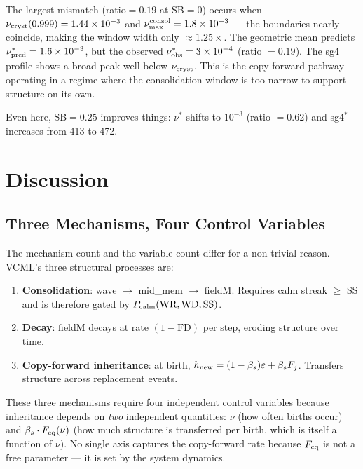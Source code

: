 \documentclass[11pt]{article}
\begin{document}
The largest mismatch (ratio$=0.19$ at SB$=0$) occurs when
$\nu_{\rm cryst}(0.999) = 1.44\times10^{-3}$ and
$\nu_{\rm max}^{\rm consol} = 1.8\times10^{-3}$ --- the boundaries nearly
coincide, making the window width only $\approx 1.25\times$. The geometric
mean predicts $\nu^*_{\rm pred} = 1.6\times10^{-3}$, but the observed
$\nu^*_{\rm obs} = 3\times10^{-4}$ (ratio $= 0.19$). The sg4 profile shows a
broad peak well below $\nu_{\rm cryst}$. This is the copy-forward pathway
operating in a regime where the consolidation window is too narrow to support
structure on its own.

Even here, SB$=0.25$ improves things: $\nu^*$ shifts to $10^{-3}$
(ratio $= 0.62$) and sg4$^*$ increases from 413 to 472.

\section{Discussion}

\subsection{Three Mechanisms, Four Control Variables}

The mechanism count and the variable count differ for a non-trivial reason.
VCML's three structural processes are:
\begin{enumerate}
\item \textbf{Consolidation}: wave $\to$ mid\_mem $\to$ fieldM. Requires
  calm streak $\geq$ SS and is therefore gated by $P_{\rm calm}(\text{WR},
  \text{WD}, \text{SS})$.
\item \textbf{Decay}: fieldM decays at rate $(1-\text{FD})$ per step,
  eroding structure over time.
\item \textbf{Copy-forward inheritance}: at birth, $h_{\rm new} = (1-\beta_s)
  \varepsilon + \beta_s F_j$. Transfers structure across replacement events.
\end{enumerate}

These three mechanisms require four independent control variables because
inheritance depends on \emph{two} independent quantities: $\nu$ (how often
births occur) and $\beta_s \cdot F_{\rm eq}(\nu)$ (how much structure is
transferred per birth, which is itself a function of $\nu$). No single axis
captures the copy-forward rate because $F_{\rm eq}$ is not a free parameter
--- it is set by the system dynamics.
\end{document}

